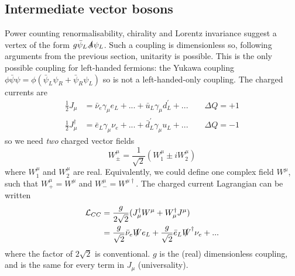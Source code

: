 \subsection{Intermediate vector bosons}
%
Power counting renormalisability, chirality and Lorentz invariance suggest a vertex of the form $g\bar{\psi}_L\slashed{A}\psi_L$. Such a coupling is dimensionless so, following arguments from the previous section, unitarity is possible. This is the only possible coupling for left-handed fermions: the Yukawa coupling $\phi \bar{\psi}\psi = \phi(\bar{\psi}_L\psi_R + \bar{\psi}_R\psi_L)$ so is not a left-handed-only coupling. The charged currents are
\begin{equation}
\begin{split}
\frac{1}{2}J_\mu &= \bar{\nu}_e\gamma_\mu e_L + ... + \bar{u}_L \gamma_\mu d^\prime_L + ... \qquad \Delta Q = +1 \\
\frac{1}{2}J_\mu^\dagger &= \bar{e}_L \gamma_\mu \nu_e + ... + \bar{d}^\prime_L \gamma_\mu u_L + ... \qquad \Delta Q = -1
\end{split}
\end{equation}
so we need \textit{two} charged vector fields 
\begin{equation}
W_\pm^\mu = \frac{1}{\sqrt{2}} (W_1^\mu \pm i W_2^\mu)
\end{equation}
where $W_1^\mu$ and $W_2^\mu$ are real. Equivalently, we could define one complex field $W^\mu$, such that $W_+^\mu = W^\mu$ and $W_-^\mu = W^{\mu \dagger}$. The charged current Lagrangian can be written
\begin{equation}
\begin{split}
\mathcal{L}_{CC} &= \frac{g}{2\sqrt{2}}(J_\mu^\dagger W^\mu + W_\mu^\dagger J^\mu) \\
&= \frac{g}{\sqrt{2}}\bar{\nu}_e \slashed{W} e_L + \frac{g}{\sqrt{2}}\bar{e}_L \slashed{W}^\dagger \nu_e + ...
\end{split}
\end{equation}
where the factor of $2\sqrt{2}$ is conventional. $g$ is the (real) dimensionless coupling, and is the same for every term in $J_\mu$ (universality). 

